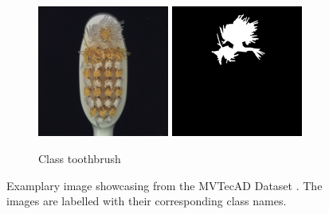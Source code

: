 \begin{figure}[ht]
\begin{subfigure}[b]{0.3\textwidth}
    \end{subfigure}
    \hfill
    \begin{subfigure}[b]{0.3\textwidth}
        \centering
        \includegraphics[width=0.475\textwidth]{figures/mvtecadexampleimages/toothbrush029.png}
        \includegraphics[width=0.475\textwidth]{figures/mvtecadexampleimages/toothbrush029_mask.png}
        \caption*{Class toothbrush}

    \end{subfigure}
    \caption{Examplary image showcasing from the MVTecAD Dataset \cite{MVTEC_Bergmann_2021}. The images are labelled with their corresponding class names.}
    \label{fig:mvtecexampleimages}
\end{figure}